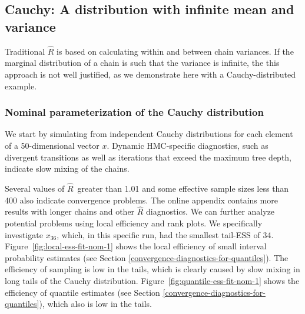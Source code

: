 \documentclass[american,]{article}
\newcommand{\Rhat}{$\widehat{R}$}
\theoremstyle{definition}
\begin{document}
\hypertarget{cauchy-a-distribution-with-infinite-mean-and-variance}{%
\subsection{Cauchy: A distribution with infinite mean and
variance}\label{cauchy-a-distribution-with-infinite-mean-and-variance}}

Traditional \(\widehat{R}\) is based on calculating
within and between chain variances. If the marginal distribution of a
chain is such that the variance is infinite, the
this approach is not well justified, as we demonstrate here with a Cauchy-distributed example.

\hypertarget{nominal-parameterization-of-the-cauchy-distribution}{%
\subsubsection*{Nominal parameterization of the
Cauchy distribution}\label{nominal-parameterization-of-the-cauchy-distribution}}

We start by simulating  from  independent Cauchy distributions for each element of a 50-dimensional 
vector $x$. Dynamic HMC-specific diagnostics, such as divergent
transitions as well as iterations that exceed the maximum tree depth,
indicate slow mixing of the chains.


Several values of \Rhat\ greater than 1.01 and some effective sample sizes less than 400 also indicate convergence problems. The online appendix contains more results 
with longer chains and other \(\widehat{R}\) diagnostics.
%
We can further analyze potential problems using local efficiency and
rank plots. We specifically investigate \(x_{36}\), which, in this
specific run, had the smallest tail-ESS of 34. 
Figure~\ref{fig:local-ess-fit-nom-1} shows the local efficiency of small 
interval probability estimates (see Section \ref{convergence-diagnostics-for-quantiles}).
The efficiency of sampling is low in the tails, which is clearly
caused by slow mixing in long tails of the Cauchy distribution.  
%
Figure~\ref{fig:quantile-ess-fit-nom-1} shows the efficiency
of quantile estimates (see Section \ref{convergence-diagnostics-for-quantiles}), 
which also is low in the tails. 
\end{document}
